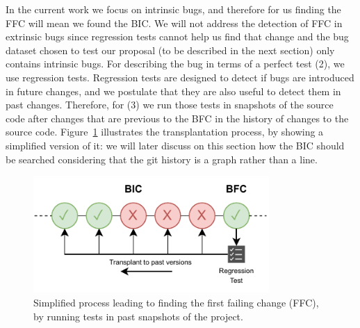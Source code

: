 In the current work we focus on intrinsic bugs, and therefore for us finding the FFC will mean we found the BIC.
We will not address the detection of FFC in extrinsic bugs since regression tests cannot help us find that change and the bug dataset chosen to test our proposal (to be described in the next section) only contains intrinsic bugs.
For describing the bug in terms of a perfect test (2), we use regression tests. Regression tests are designed to detect if bugs are introduced in future changes, and we postulate that they are also useful to detect them in past changes.
Therefore, for (3) we run those tests in snapshots of the source code after changes that are previous to the BFC  in the history of changes to the source code. 
Figure~\ref{fig:process} illustrates the transplantation process, by showing a simplified version of it: we will later discuss on this section how the BIC should be searched considering that the git history is a graph rather than a line.

\begin{figure}[h!]
  \centering    
  \includegraphics[width=0.8\textwidth]{pages/03-BugHunter/images/Model_Inverted.pdf}
  \vspace{-0.5cm}
  \caption{Simplified process leading to finding the first failing change (FFC), by running tests in past snapshots of the project.}
  \label{fig:process}
  \vspace{-0.5cm}
\end{figure}


